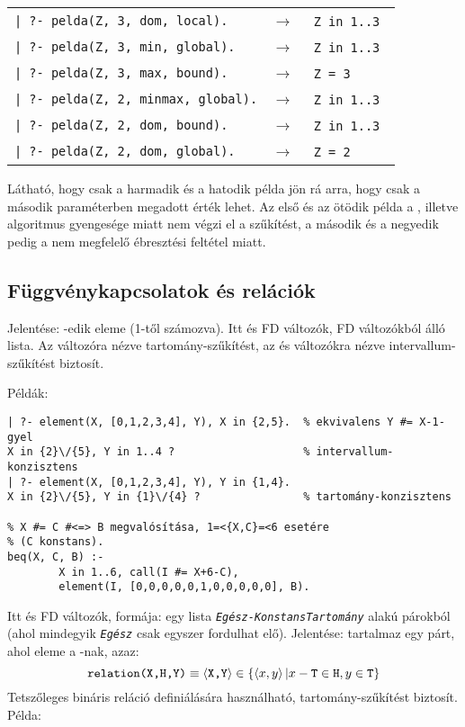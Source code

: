 \begin{tabular}{ll}
\verb'| ?- pelda(Z, 3, dom, local).'    & $\rightarrow$ \verb'  Z in 1..3 '  \\
\verb'| ?- pelda(Z, 3, min, global).'   & $\rightarrow$ \verb'  Z in 1..3 '  \\
\verb'| ?- pelda(Z, 3, max, bound).'    & $\rightarrow$ \verb'  Z = 3     '  \\
\verb'| ?- pelda(Z, 2, minmax, global).'& $\rightarrow$ \verb'  Z in 1..3 '  \\
\verb'| ?- pelda(Z, 2, dom, bound).'    & $\rightarrow$ \verb'  Z in 1..3 '  \\
\verb'| ?- pelda(Z, 2, dom, global).'   & $\rightarrow$ \verb'  Z = 2     '  \\
\end{tabular}
\br
Látható, hogy csak a harmadik és a hatodik példa jön rá arra, hogy  csak
a második paraméterben megadott érték lehet. Az első és az ötödik példa a ,
illetve  algoritmus gyengesége miatt nem végzi el a szűkítést, a második
és a negyedik pedig a nem megfelelő ébresztési feltétel miatt.

\subsection{Függvénykapcsolatok és relációk}

{}

Jelentése:  -edik eleme  (1-től számozva). Itt  és 
FD változók,  FD változókból álló lista. Az  változóra nézve
tartomány-szűkítést, az  és  változókra nézve intervallum-szűkítést
biztosít.

Példák:

\begin{verbatim}
| ?- element(X, [0,1,2,3,4], Y), X in {2,5}.  % ekvivalens Y #= X-1-gyel
X in {2}\/{5}, Y in 1..4 ?                    % intervallum-konzisztens
| ?- element(X, [0,1,2,3,4], Y), Y in {1,4}.
X in {2}\/{5}, Y in {1}\/{4} ?                % tartomány-konzisztens

% X #= C #<=> B megvalósítása, 1=<{X,C}=<6 esetére
% (C konstans).
beq(X, C, B) :-
        X in 1..6, call(I #= X+6-C),
        element(I, [0,0,0,0,0,1,0,0,0,0,0], B).
\end{verbatim}

\medskip
{}

Itt  és  FD változók,  formája: egy lista
{\tt\em Egész-KonstansTartomány} alakú párokból (ahol mindegyik {\tt\em Egész}
csak egyszer fordulhat elő). Jelentése:  tartalmaz egy  párt,
ahol  eleme a -nak, azaz: \[ \texttt{relation(X,H,Y)} \equiv \left\langle\texttt{X,Y}\right\rangle
\in \{\left\langle x,y\right\rangle|x-\texttt{T} \in \texttt{H}, y \in \texttt{T}\}\] Tetszőleges bináris reláció
definiálására használható, tartomány-szűkítést biztosít. Példa:

